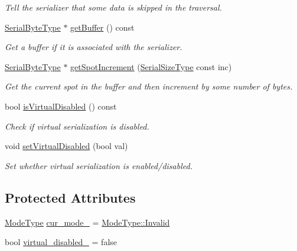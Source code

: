 \begin{DoxyCompactItemize}
\begin{DoxyCompactList}\small\item\em Tell the serializer that some data is skipped in the traversal. \end{DoxyCompactList}\item 
\hyperlink{namespacecheckpoint_ae57f01cdc0b81776c23b6c7c934c58f5}{Serial\+Byte\+Type} $\ast$ \hyperlink{structcheckpoint_1_1_serializer_a6231bd380e02ee8668e7a6efebca2664}{get\+Buffer} () const
\begin{DoxyCompactList}\small\item\em Get a buffer if it is associated with the serializer. \end{DoxyCompactList}\item 
\hyperlink{namespacecheckpoint_ae57f01cdc0b81776c23b6c7c934c58f5}{Serial\+Byte\+Type} $\ast$ \hyperlink{structcheckpoint_1_1_serializer_af2fc82901c31232b7549b20a8732de30}{get\+Spot\+Increment} (\hyperlink{namespacecheckpoint_a083f6674da3f94c2901b18c6d238217c}{Serial\+Size\+Type} const inc)
\begin{DoxyCompactList}\small\item\em Get the current spot in the buffer and then increment by some number of bytes. \end{DoxyCompactList}\item 
bool \hyperlink{structcheckpoint_1_1_serializer_af45e225cdb3a750a06de80a8cd5c6c37}{is\+Virtual\+Disabled} () const
\begin{DoxyCompactList}\small\item\em Check if virtual serialization is disabled. \end{DoxyCompactList}\item 
void \hyperlink{structcheckpoint_1_1_serializer_af57d7cd51e94dd44a5be184456c2d59f}{set\+Virtual\+Disabled} (bool val)
\begin{DoxyCompactList}\small\item\em Set whether virtual serialization is enabled/disabled. \end{DoxyCompactList}\end{DoxyCompactItemize}
\subsection*{Protected Attributes}
\begin{DoxyCompactItemize}
\item 
\hyperlink{namespacecheckpoint_ae2509499ccd8b1dc48fb535bf8aa3059}{Mode\+Type} \hyperlink{structcheckpoint_1_1_serializer_a89a1f207ad5ff75654cb6d48f432be37}{cur\+\_\+mode\+\_\+} = \hyperlink{namespacecheckpoint_ae2509499ccd8b1dc48fb535bf8aa3059a4bbb8f967da6d1a610596d7257179c2b}{Mode\+Type\+::\+Invalid}
\item 
bool \hyperlink{structcheckpoint_1_1_serializer_a46ef3c0da77d80853882a7cad641c2af}{virtual\+\_\+disabled\+\_\+} = false
\end{DoxyCompactItemize}



